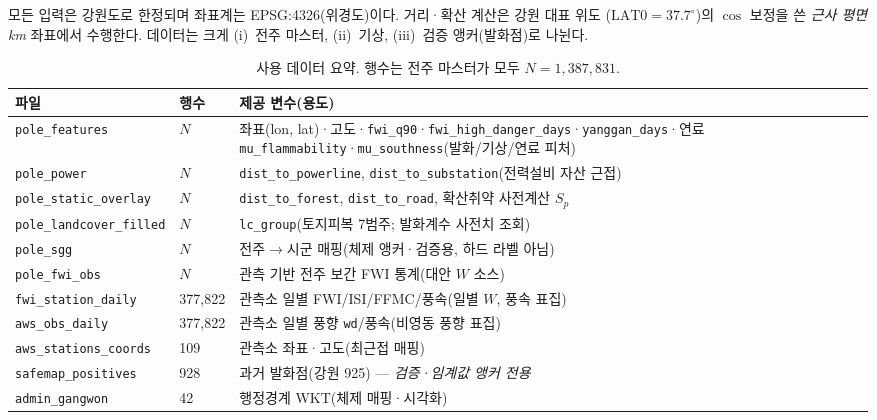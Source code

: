 \documentclass[11pt,a4paper]{article}
\begin{document}
모든 입력은 강원도로 한정되며 좌표계는 EPSG:4326(위경도)이다. 거리·확산 계산은 강원 대표 위도
($\mathrm{LAT0}=37.7^\circ$)의 $\cos$ 보정을 쓴 \emph{근사 평면 km} 좌표에서 수행한다. 데이터는
크게 (i)~전주 마스터, (ii)~기상, (iii)~검증 앵커(발화점)로 나뉜다.

\begin{table}[H]
\centering
\caption{사용 데이터 요약. 행수는 전주 마스터가 모두 $N=1{,}387{,}831$.}
\label{tab:data}
\small
\begin{tabular}{p{3.4cm}p{1.6cm}p{8.4cm}}
\toprule
파일 & 행수 & 제공 변수(용도) \\
\midrule
\texttt{pole\_features} & $N$ & 좌표(lon, lat)·고도·\texttt{fwi\_q90}·\texttt{fwi\_high\_danger\_days}·\texttt{yanggan\_days}·연료 \texttt{mu\_flammability}·\texttt{mu\_southness}(발화/기상/연료 피처) \\
\texttt{pole\_power} & $N$ & \texttt{dist\_to\_powerline}, \texttt{dist\_to\_substation}(전력설비 자산 근접) \\
\texttt{pole\_static\_overlay} & $N$ & \texttt{dist\_to\_forest}, \texttt{dist\_to\_road}, 확산취약 사전계산 $S_p$ \\
\texttt{pole\_landcover\_filled} & $N$ & \texttt{lc\_group}(토지피복 7범주; 발화계수 사전치 조회) \\
\texttt{pole\_sgg} & $N$ & 전주$\to$시군 매핑(체제 앵커·검증용, 하드 라벨 아님) \\
\texttt{pole\_fwi\_obs} & $N$ & 관측 기반 전주 보간 FWI 통계(대안 $W$ 소스) \\
\texttt{fwi\_station\_daily} & 377{,}822 & 관측소 일별 FWI/ISI/FFMC/풍속(일별 $W$, 풍속 표집) \\
\texttt{aws\_obs\_daily} & 377{,}822 & 관측소 일별 풍향 \texttt{wd}/풍속(비영동 풍향 표집) \\
\texttt{aws\_stations\_coords} & 109 & 관측소 좌표·고도(최근접 매핑) \\
\texttt{safemap\_positives} & 928 & 과거 발화점(강원 925) — \emph{검증·임계값 앵커 전용} \\
\texttt{admin\_gangwon} & 42 & 행정경계 WKT(체제 매핑·시각화) \\
\bottomrule
\end{tabular}
\end{table}
\end{document}
